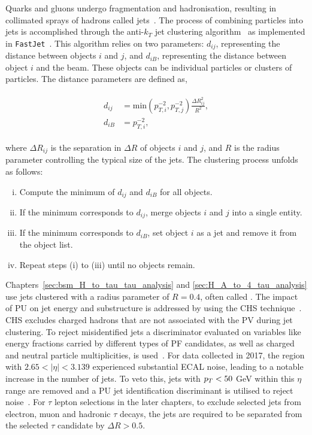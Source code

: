 Quarks and gluons undergo fragmentation and hadronisation, resulting in collimated sprays of hadrons called jets~\cite{Salam:2010nqg}. 
The process of combining particles into jets is accomplished through the anti-$k_T$ jet clustering algorithm~\cite{Cacciari:2008gp} as implemented in \texttt{FastJet}~\cite{Cacciari:2011ma}. 
This algorithm relies on two  parameters: $d_{ij}$, representing the distance between objects $i$ and $j$, and $d_{iB}$, representing the distance between object $i$ and the beam. 
These objects can be individual particles or clusters of particles. 
The distance parameters are defined as,

\begin{align}
\begin{split}
d_{ij} &= \text{min}(p_{T,i}^{-2}, p_{T,j}^{-2})  \frac{\Delta R_{ij}^{2}}{R^{2}}, \\ 
d_{iB} &= p_{T,i}^{-2}, 
\end{split}
\end{align} 
 
where $\Delta R_{ij}$ is the separation in $\Delta R$ of objects $i$ and $j$, and $R$ is the radius parameter controlling the typical size of the jets. 
The clustering process unfolds as follows:

\begin{enumerate}[i)]
\item Compute the minimum of $d_{ij}$ and $d_{iB}$ for all objects.
\item If the minimum corresponds to $d_{ij}$, merge objects $i$ and $j$ into a single entity.
\item If the minimum corresponds to $d_{iB}$, set object $i$ as a jet and remove it from the object list.
\item Repeat steps (i) to (iii) until no objects remain. 
\end{enumerate}

Chapters~\ref{sec:bsm_H_to_tau_tau_analysis} and \ref{sec:H_A_to_4_tau_analysis} use jets clustered with a radius parameter of $R = 0.4$, often called .
The impact of \ac{PU} on jet energy and substructure is addressed by using the \ac{CHS} technique~\cite{CMS:2017wyc}. 
\ac{CHS} excludes charged hadrons that are not associated with the \ac{PV} during jet clustering. 
To reject misidentified jets a discriminator evaluated on variables like energy fractions carried by different types of \ac{PF} candidates, as well as charged and neutral particle multiplicities, is used~\cite{CMS:2017wyc}. 
For data collected in 2017, the region with $2.65 < |\eta| < 3.139$ experienced substantial \ac{ECAL} noise, leading to a notable increase in the number of jets. 
To veto this, jets with $p_{T} < 50$ GeV within this $\eta$ range are removed and a \ac{PU} jet identification discriminant is utilised to reject noise~\cite{CMS:2013wea}.
For $\tau$ lepton selections in the later chapters, to exclude selected jets from electron, muon and hadronic $\tau$ decays, the jets are required to be separated from the selected $\tau$ candidate by $\Delta R > 0.5$.

